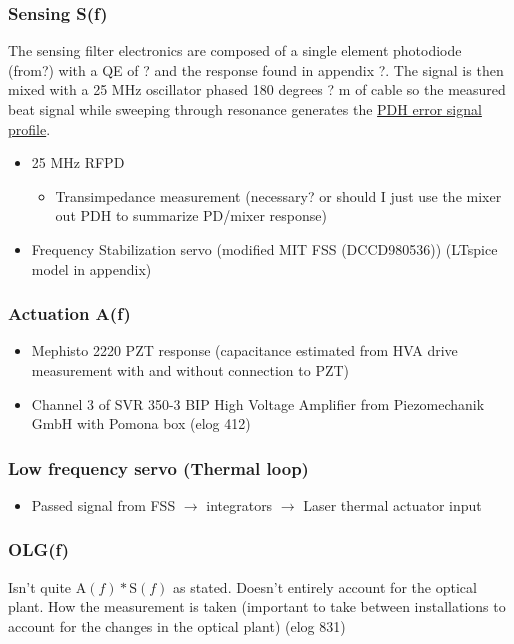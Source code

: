 \subsubsection{Sensing S(f)}
The sensing filter electronics are composed of a single element photodiode (from?) with a QE of ? and the response found in appendix ?. The signal is then mixed with a 25 MHz oscillator phased 180 degrees ? m of cable so the measured beat signal while sweeping through resonance generates the \hyperref[fig:pdh_error]{PDH error signal profile}.
\begin{itemize}
\item 25 MHz RFPD
\begin{itemize}
\item Transimpedance measurement (necessary? or should I just use the mixer out PDH to summarize PD/mixer response)
\end{itemize}
\item Frequency Stabilization servo (modified MIT FSS (DCCD980536)) (LTspice model in appendix)
\end{itemize}


\subsubsection{Actuation A(f)}
\begin{itemize}
\item Mephisto 2220 PZT response (capacitance estimated from HVA drive measurement with and without connection to PZT)
\item Channel 3 of SVR 350-3 BIP High Voltage Amplifier from Piezomechanik GmbH with Pomona box (elog 412)

\end{itemize}

\subsubsection{Low frequency servo (Thermal loop)}
\begin{itemize}
\item Passed signal from FSS $\rightarrow$ integrators $\rightarrow$ Laser thermal actuator input
\end{itemize}

\subsubsection{OLG(f)}
Isn't quite $\mathrm{A}(f)*\mathrm{S}(f)$ as stated. Doesn't entirely account for the optical plant.
How the measurement is taken (important to take between installations to account for the changes in the optical plant) (elog 831)

